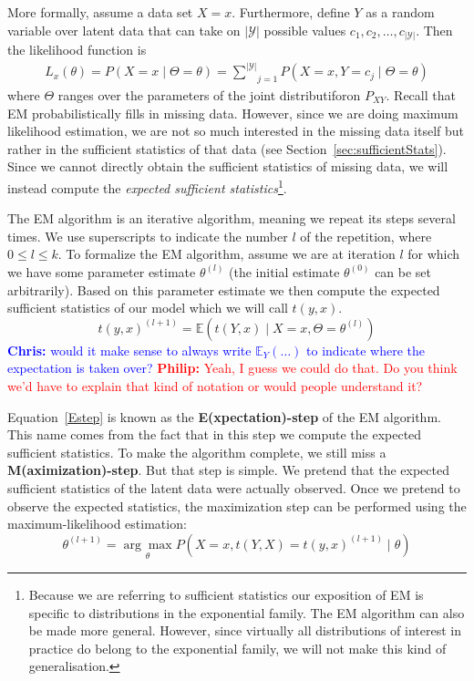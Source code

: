 \documentclass[a4paper,11pt,leqno]{report}\usepackage[]{graphicx}\usepackage[]{color}
\newcommand{\E}{\mathbb{E}}
\newcommand{\philip}[1]{ \textcolor{red}{\textbf{Philip:} #1}}
\newcommand{\chris}[1]{ \textcolor{blue}{\textbf{Chris:} #1}}
\begin{document}
More formally, assume a data set $ X=x $. Furthermore, define $ Y $ as a random variable over latent data that can
take on $ |\mathcal{Y}| $ possible values $c_1, c_2, \ldots, c_{|\mathcal{Y}|}$. Then the likelihood function is 
\begin{align}
L_{x}(\theta) = P(X=x \mid \Theta=\theta) = \underset{j=1}{\overset{|\mathcal{Y}|}{\sum}} P(X=x, Y=c_{j} \mid \Theta=\theta)
\end{align}
where $ \Theta $ ranges over the parameters of the joint distributiforon $ P_{XY} $. Recall that EM
probabilistically fills in missing data. However, since we are doing maximum likelihood estimation, we
are not so much interested in the missing data itself but rather in the sufficient statistics of
that data (see Section~\ref{sec:sufficientStats}). Since we cannot directly obtain the sufficient statistics
of missing data, we will instead compute the \textit{expected sufficient statistics}\footnote{
Because we are referring to sufficient statistics our exposition of EM is specific to distributions
in the exponential family. The EM algorithm can also be made more general. However, since virtually
all distributions of interest in practice do belong to the exponential family, we will not make this kind of generalisation.
}.

The EM algorithm is an iterative 
algorithm, meaning we repeat its steps several
times. We use superscripts to indicate the number $l$ of the repetition, where $ 0 \leq l \leq k $.
To formalize the EM algorithm, assume we are at iteration $l$ for which we have some parameter estimate 
$\theta^{(l)} $ (the initial estimate $\theta^{(0)}$ can be set arbitrarily). Based on this parameter 
estimate we then compute the expected sufficient statistics of our model which we will call $ t(y,x) $.
\begin{equation} \label{Estep}
t(y,x)^{(l+1)} = \E(t(Y,x) \mid X = x,\Theta = \theta^{(l)})
\end{equation} 
\chris{would it make sense to always write $\E_Y(\ldots)$ to indicate where the expectation is taken over?}\philip{Yeah, I guess we could do that. Do you think we'd have
to explain that kind of notation or would people understand it?}

Equation~\eqref{Estep} is known as the \textbf{E(xpectation)-step} of the EM algorithm. This name
comes from the fact that in this step we compute the expected sufficient statistics. 
To make the algorithm complete, we still miss a
\textbf{M(aximization)-step}. But that step is simple. We pretend that the expected sufficient statistics of 
the latent data were actually observed. Once we pretend to observe the expected statistics, the maximization 
step can be performed using the maximum-likelihood estimation:
\begin{equation} \label{Mstep}
\theta^{(l+1)} = \underset{\theta}{\arg\max}  P(X=x, t(Y,X) = t(y,x)^{(l+1)} \mid \theta)
\end{equation}
\end{document}

